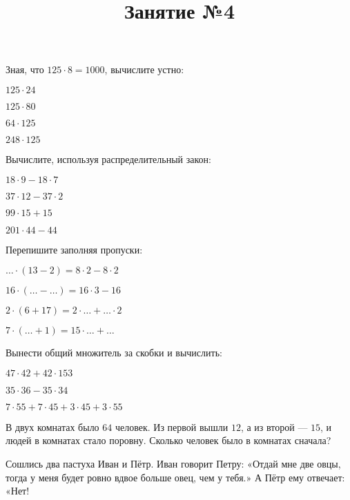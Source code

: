\begin{class}[number=1]
\begin{listofex}
\begin{enumcols}[itemcolumns=4]
	\end{enumcols}
	\item Зная, что \( 125\cdot8=1000 \), вычислите устно:
	\begin{enumcols}[itemcolumns=4]
		\item \( 125\cdot24 \)
		\item \( 125\cdot80 \)
		\item \( 64\cdot125 \)
		\item \( 248\cdot125 \)
	\end{enumcols}
\end{listofex}
\newpage
\title{Занятие №4}
\begin{listofex}
	\item Вычислите, используя распределительный закон:
	\begin{enumcols}[itemcolumns=2]
		\item \( 18\cdot9-18\cdot7 \)
		\item \( 37\cdot12-37\cdot2 \)
		\item \( 99\cdot15+15 \)
		\item \( 201\cdot44-44 \)
	\end{enumcols}
	\item Перепишите заполняя пропуски:
	\begin{enumcols}[itemcolumns=2]
		\item \( {\dots}\cdot(13-2)=8\cdot2-8\cdot2 \)
		\item \( 16\cdot({\dots}-\dots)=16\cdot3-16 \)
		\item \( 2\cdot(6+17)=2\cdot{\dots}+{\dots}\cdot2 \)
		\item \( 7\cdot({\dots}+1)=15\cdot{\dots}+{\dots} \)
	\end{enumcols}
	\item Вынести общий множитель за скобки и вычислить:
	\begin{enumcols}[itemcolumns=3]
		\item \( 47\cdot42+42\cdot153 \)
		\item \( 35\cdot36-35\cdot34 \)
		\item \( 7\cdot55+7\cdot45+3\cdot45+3\cdot55 \)
	\end{enumcols}
	\item В двух комнатах было \( 64 \) человек. Из первой вышли \( 12 \), а из второй --- \( 15 \), и людей в комнатах стало поровну. Сколько человек было в комнатах сначала?
	\item Сошлись два пастуха Иван и Пётр. Иван говорит Петру: «Отдай мне две овцы,
	тогда у меня будет ровно вдвое больше овец, чем у тебя.» А Пётр ему отвечает: «Нет!

\end{listofex}
\end{class}
